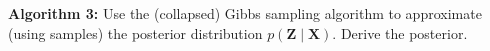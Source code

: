\textbf{Algorithm 3:} Use the (collapsed) Gibbs sampling algorithm to approximate (using samples) the posterior distribution $p(\boldsymbol{Z} \mid \boldsymbol{X})$. Derive the posterior. \\\\